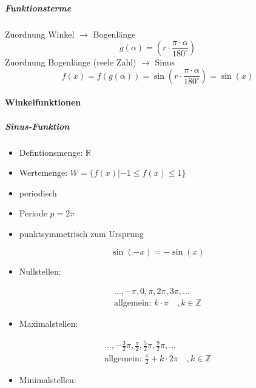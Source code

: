 \documentclass[
  11pt,
  a4paper,
  DIV=11,
  numbers=noendperiod]{scrartcl}
\let\oldparagraph\paragraph
\renewcommand{\paragraph}[1]{\oldparagraph{#1}\mbox{}}
\let\oldsubparagraph\subparagraph
\renewcommand{\subparagraph}[1]{\oldsubparagraph{#1}\mbox{}}
\providecommand{\tightlist}{%
  \setlength{\itemsep}{0pt}\setlength{\parskip}{0pt}}\usepackage{longtable,booktabs,array}
\begin{document}
\subparagraph{Funktionsterme}\label{funktionsterme}

Zuordnung Winkel \(\rightarrow\) Bogenlänge \[
g(\alpha)=\left(r \cdot \frac{\pi \cdot\alpha}{180^\circ}\right)
\] Zuordnung Bogenlänge (reele Zahl) \(\rightarrow\) Sinus \[
f(x)=f(g(\alpha))=\sin\left(r \cdot \frac{\pi \cdot\alpha}{180^\circ}\right)=\sin(x)
\]

\paragraph{Winkelfunktionen}\label{winkelfunktionen}

\subparagraph{Sinus-Funktion}\label{sinus-funktion}

\begin{itemize}
\tightlist
\item
  Defintionsmenge: \(\mathbb{R}\)
\item
  Wertemenge: \(W=\{f(x)|-1\leq f(x)\leq 1\}\)
\item
  periodisch
\item
  Periode \(p=2\pi\)
\item
  punktsymmetrisch zum Ursprung
\end{itemize}

\[
\sin(-x)=-\sin(x)
\]

\begin{itemize}
\tightlist
\item
  Nullstellen:
\end{itemize}

\[
\begin{aligned}
..., -\pi, 0, \pi, 2\pi, 3\pi, ...\\
\text{allgemein: }k\cdot \pi \quad, k\in \mathbb{Z}
\end{aligned}
\]

\begin{itemize}
\tightlist
\item
  Maximalstellen:
\end{itemize}

\[
\begin{aligned}
..., -\frac{3}{2}\pi, \frac{\pi}{2}, \frac{5}{2}\pi, \frac{9}{2}\pi, ...\\
\text{allgemein: }\frac{\pi}{2}+k\cdot 2\pi \quad , k\in \mathbb{Z}
\end{aligned}
\]

\begin{itemize}
\tightlist
\item
  Minimalstellen:
\end{itemize}
\end{document}
